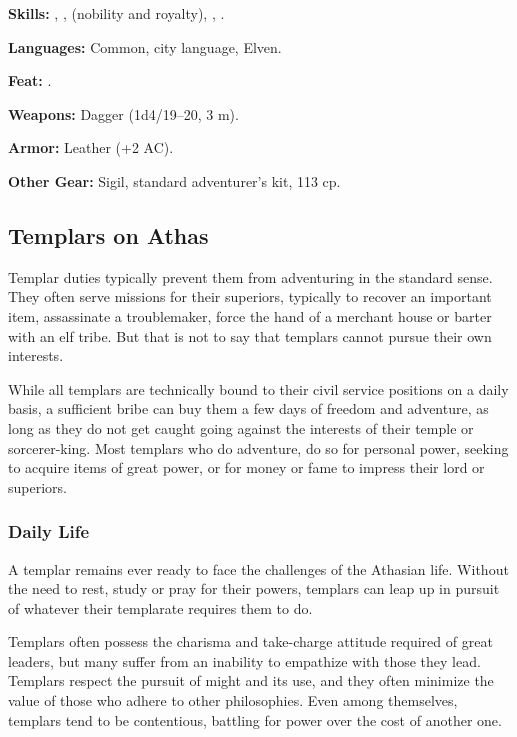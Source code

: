 \textbf{Skills:} , ,  (nobility and royalty), , .

\textbf{Languages:} Common, city language, Elven.

\textbf{Feat:} .

\textbf{Weapons:} Dagger (1d4/19--20, 3 m).

\textbf{Armor:} Leather (+2 AC).

\textbf{Other Gear:} Sigil, standard adventurer's kit, 113 cp.


\subsection{Templars on Athas}
Templar duties typically prevent them from adventuring in the standard sense. They often serve missions for their superiors, typically to recover an important item, assassinate a troublemaker, force the hand of a merchant house or barter with an elf tribe. But that is not to say that templars cannot pursue their own interests.

While all templars are technically bound to their civil service positions on a daily basis, a sufficient bribe can buy them a few days of freedom and adventure, as long as they do not get caught going against the interests of their temple or sorcerer-king. Most templars who do adventure, do so for personal power, seeking to acquire items of great power, or for money or fame to impress their lord or superiors.

\subsubsection{Daily Life}
A templar remains ever ready to face the challenges of the Athasian life. Without the need to rest, study or pray for their powers, templars can leap up in pursuit of whatever their templarate requires them to do.

Templars often possess the charisma and take-charge attitude required of great leaders, but many suffer from an inability to empathize with those they lead. Templars respect the pursuit of might and its use, and they often minimize the value of those who adhere to other philosophies. Even among themselves, templars tend to be contentious, battling for power over the cost of another one.

